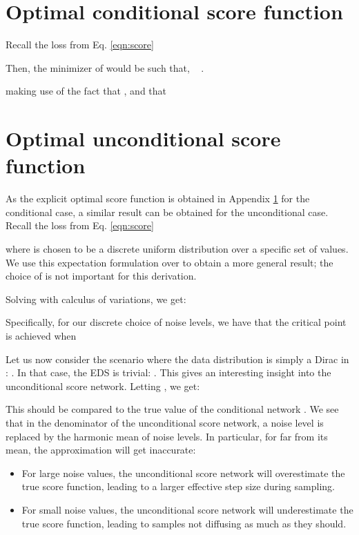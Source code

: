 \documentclass{article} \usepackage{iclr2021_conference_notitle,times}
\theoremstyle{definition}
\theoremstyle{definition}
\begin{document}
\section{Optimal conditional score function}
\label{app:C}

Recall the loss from Eq. \ref{eqn:score}

Then, the minimizer  of  would be such that,  ~ .



making use of the fact that  ,  and that 



\section{Optimal unconditional score function}
\label{app:D}

As the explicit optimal score function is obtained in Appendix \ref{app:C} for the conditional case, a similar result can be obtained for the unconditional case. Recall the loss from Eq. \ref{eqn:score}


where  is chosen to be a discrete uniform distribution over a specific set of values. We use this expectation formulation over  to obtain a more general result; the choice of  is not important for this derivation.

Solving with calculus of variations, we get:


Specifically, for our discrete choice of noise levels, we have that the critical point is achieved when 

Let us now consider the scenario where the data distribution is simply a Dirac in : . In that case, the EDS is trivial: . This gives an interesting insight into the unconditional score network. Letting , we get:

This should be compared to the true value of the conditional network . We see that in the denominator of the unconditional score network, a noise level is replaced by the harmonic mean of noise levels. In particular, for  far from its mean, the approximation will get inaccurate:
\begin{itemize}
    \item For large noise values, the unconditional score network will overestimate the true score function, leading to a larger effective step size during sampling.
    \item For small noise values, the unconditional score network will underestimate the true score function, leading to samples not diffusing as much as they should.
\end{itemize}
\end{document}
